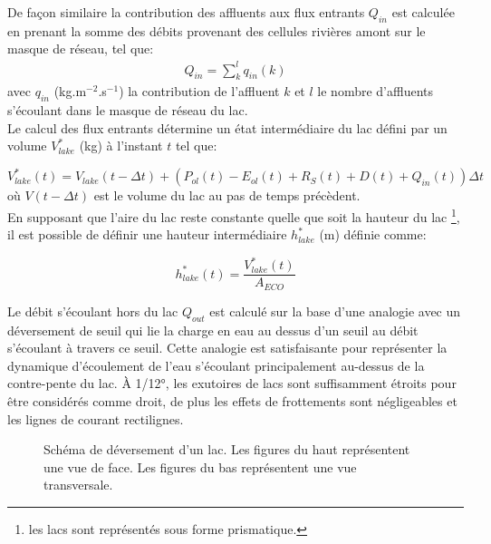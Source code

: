 \noindent De façon similaire la contribution des affluents aux flux entrants $Q_{in}$ est calculée en prenant la somme des débits provenant des cellules rivières amont sur le masque de réseau, tel que: 
\clearpage
\begin{align}\label{mlake_qin}
 Q_{in} = \sum^{l}_{k} q_{in}(k)
\end{align}
avec $q_{in}$ (kg.m$^{-2}$.s$^{-1}$) la contribution de l'affluent $k$ et $l$ le nombre d'affluents s'écoulant dans le masque de réseau du lac. \\

\noindent Le calcul des flux entrants détermine un état intermédiaire du lac défini par un volume $V_{lake}^{*}$ (kg) à l'instant $t$ tel que:

\begin{equation}
V^{*}_{lake}(t) = V_{lake}(t-\Delta t) + (P_{ol}(t) - E_{ol}(t) +  R_{S}(t)+ D(t) +  Q_{in}(t))\Delta t
\end{equation}
où $V(t-\Delta t)$ est le volume du lac au pas de temps précèdent.\\

\noindent En supposant que l'aire du lac reste constante quelle que soit la hauteur du lac \footnote{les lacs sont représentés sous forme prismatique.}, il est possible de définir une hauteur intermédiaire $h_{lake}^{*}$ (m) définie comme:

\begin{equation}
h_{lake}^{*}(t) = \frac {V_{lake}^{*}(t)}{A_{ECO}}
\end{equation}

\noindent Le débit s'écoulant hors du lac $Q_{out}$ est calculé sur la base d'une analogie avec un déversement de seuil qui lie la charge en eau au dessus d'un seuil au débit s'écoulant à travers ce seuil. Cette analogie est satisfaisante pour représenter la dynamique d'écoulement de l'eau s'écoulant principalement au-dessus de la contre-pente du lac. À 1/12°, les exutoires de lacs sont suffisamment étroits pour être considérés comme droit, de plus les effets de frottements sont négligeables et les lignes de courant rectilignes.\\

\begin{figure}[h!]
     \centering
     \hfill
     \hfill
     \caption{Schéma de déversement d'un lac. Les figures du haut représentent une vue de face. Les figures du bas représentent une vue transversale.}
     \label{qovfl}
\end{figure}

